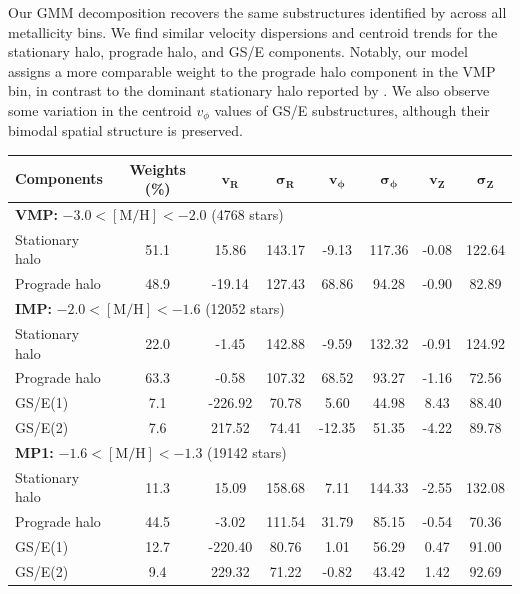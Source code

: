 \documentclass[a4paper,12pt]{article}
\begin{document}
Our GMM decomposition recovers the same substructures identified by \citet{zhang2024existencemetalpoordiscmilky} 
across all metallicity bins. We find similar velocity dispersions and centroid trends for the stationary halo, 
prograde halo, and GS/E components. Notably, our model assigns a more comparable weight to the 
prograde halo component in the VMP bin, in contrast to the dominant stationary 
halo reported by \citet{zhang2024existencemetalpoordiscmilky}. We also observe some variation 
in the centroid $v_\phi$ values of GS/E substructures, although their bimodal spatial structure is preserved. 

\begin{table}
\centering
\begin{tabular}{lccccccc}
\hline
\textbf{Components} & \textbf{Weights (\%)} & $\mathbf{v_R}$ & $\boldsymbol{\sigma_R}$ & $\mathbf{v_\phi}$ & $\boldsymbol{\sigma_\phi}$ & $\mathbf{v_Z}$ & $\boldsymbol{\sigma_Z}$ \\
\hline
\multicolumn{8}{l}{\textbf{VMP:} $-3.0 < \mathrm{[M/H]} < -2.0$ (4768 stars)} \\
Stationary halo     & 51.1 & 15.86   & 143.17 &  -9.13  & 117.36 & -0.08 & 122.64 \\
Prograde halo       & 48.9 & -19.14  & 127.43 &  68.86  &  94.28 & -0.90 &  82.89 \\
\hline
\multicolumn{8}{l}{\textbf{IMP:} $-2.0 < \mathrm{[M/H]} < -1.6$ (12052 stars)} \\
Stationary halo     & 22.0 &  -1.45  & 142.88 &  -9.59  & 132.32 & -0.91 & 124.92 \\
Prograde halo       & 63.3 &  -0.58  & 107.32 &  68.52  &  93.27 & -1.16 &  72.56 \\
GS/E(1)             &  7.1 & -226.92 &  70.78 &   5.60  &  44.98 &  8.43 &  88.40 \\
GS/E(2)             &  7.6 &  217.52 &  74.41 & -12.35  &  51.35 & -4.22 &  89.78 \\
\hline
\multicolumn{8}{l}{\textbf{MP1:} $-1.6 < \mathrm{[M/H]} < -1.3$ (19142 stars)} \\
Stationary halo     & 11.3 &  15.09  & 158.68 &   7.11  & 144.33 & -2.55 & 132.08 \\
Prograde halo       & 44.5 &  -3.02  & 111.54 &  31.79  &  85.15 & -0.54 &  70.36 \\
GS/E(1)             & 12.7 & -220.40 &  80.76 &   1.01  &  56.29 &  0.47 &  91.00 \\
GS/E(2)             &  9.4 &  229.32 &  71.22 &  -0.82  &  43.42 &  1.42 &  92.69 \\

\end{tabular}
\end{table}
\end{document}
